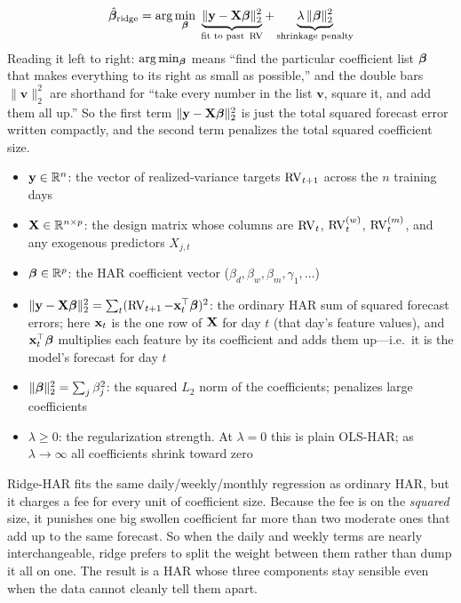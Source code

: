 \begin{equation}
  \hat{\bm{\beta}}_{\mathrm{ridge}} = \arg\min_{\bm{\beta}}\;
  \underbrace{\lVert \mathbf{y} - \mathbf{X}\bm{\beta} \rVert_2^2}_{\text{fit to past }\operatorname{RV}}
  + \underbrace{\lambda\,\lVert \bm{\beta} \rVert_2^2}_{\text{shrinkage penalty}}
  \label{eq:ridge-har-objective}
\end{equation}
Reading it left to right: $\arg\min_{\bm{\beta}}$ means ``find the particular coefficient list $\bm{\beta}$ that makes everything to its right as small as possible,'' and the double bars $\lVert\mathbf{v}\rVert_2^2$ are shorthand for ``take every number in the list $\mathbf{v}$, square it, and add them all up.''
So the first term $\lVert\mathbf{y} - \mathbf{X}\bm{\beta}\rVert_2^2$ is just the total squared forecast error written compactly, and the second term penalizes the total squared coefficient size.
\begin{itemize}[nosep]
  \item $\mathbf{y} \in \mathbb{R}^n$: the vector of realized-variance targets $\operatorname{RV}_{t+1}$ across the $n$ training days
  \item $\mathbf{X} \in \mathbb{R}^{n \times p}$: the design matrix whose columns are $\operatorname{RV}_t$, $\operatorname{RV}^{(w)}_t$, $\operatorname{RV}^{(m)}_t$, and any exogenous predictors $X_{j,t}$
  \item $\bm{\beta} \in \mathbb{R}^p$: the HAR coefficient vector ($\beta_d, \beta_w, \beta_m, \gamma_1, \ldots$)
  \item $\lVert \mathbf{y} - \mathbf{X}\bm{\beta} \rVert_2^2 = \sum_t (\operatorname{RV}_{t+1} - \mathbf{x}_t^\top\bm{\beta})^2$: the ordinary HAR sum of squared forecast errors; here $\mathbf{x}_t$ is the one row of $\mathbf{X}$ for day $t$ (that day's feature values), and $\mathbf{x}_t^\top\bm{\beta}$ multiplies each feature by its coefficient and adds them up---i.e.\ it is the model's forecast for day $t$
  \item $\lVert \bm{\beta} \rVert_2^2 = \sum_j \beta_j^2$: the squared $L_2$ norm of the coefficients; penalizes large coefficients
  \item $\lambda \geq 0$: the regularization strength. At $\lambda = 0$ this is plain OLS-HAR; as $\lambda \to \infty$ all coefficients shrink toward zero
\end{itemize}

\begin{intuition}
Ridge-HAR fits the same daily/weekly/monthly regression as ordinary HAR, but it charges a fee for every unit of coefficient size.
Because the fee is on the \emph{squared} size, it punishes one big swollen coefficient far more than two moderate ones that add up to the same forecast.
So when the daily and weekly terms are nearly interchangeable, ridge prefers to split the weight between them rather than dump it all on one.
The result is a HAR whose three components stay sensible even when the data cannot cleanly tell them apart.
\end{intuition}

